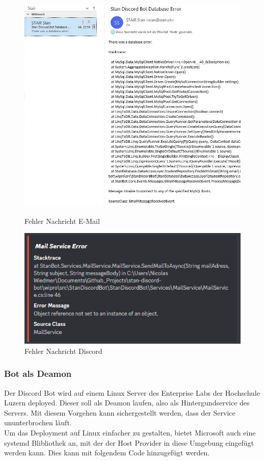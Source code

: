 \documentclass[a4paper, table]{article}
\begin{document}
\begin{figure}[h]
    \begin{minipage}[t]{0.5\textwidth}
        \includegraphics[width=1\textwidth]{img/DatabaseErrorNotificationEmail.png}
        \caption{Fehler Nachricht E-Mail}
    \end{minipage}
    \begin{minipage}[t]{0.5\textwidth}
        \includegraphics[width=1\textwidth]{img/MailErrorNotificationEmbed.png}
        \caption{Fehler Nachricht Discord}
    \end{minipage}
    \label{fig:error-notifications}
\end{figure}

\subsubsection{Bot als Deamon}
Der Discord Bot wird auf einem Linux Server des Enterprise Labs der Hochschule Luzern deployed.
Dieser soll als Deamon laufen, also als Hintergundservice des Servers.
Mit diesem Vorgehen kann sichergestellt werden, dass der Service ununterbrochen läuft.\\
Um das Deployment auf Linux einfacher zu gestalten, bietet Microsoft auch eine systemd Blibliothek an, 
mit der der Host Provider in diese Umgebung eingefügt werden kann.\autocite{dotnet-bot_systemdhostbuilderextensionsusesystemdihostbuilder_nodate}
Dies kann mit folgendem Code hinzugefügt werden.
\end{document}
